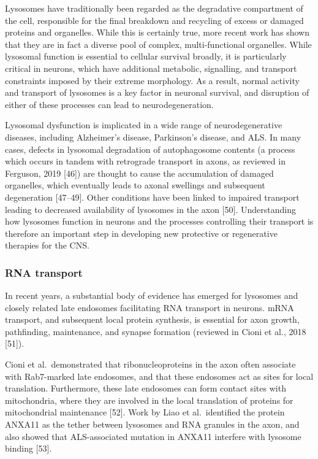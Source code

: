 \documentclass[
  12pt,
  a4paper,
]{book}
\begin{document}
Lysosomes have traditionally been regarded as the degradative compartment of the cell, responsible for the final breakdown and recycling of excess or damaged proteins and organelles. While this is certainly true, more recent work has shown that they are in fact a diverse pool of complex, multi-functional organelles. While lysosomal function is essential to cellular survival broadly, it is particularly critical in neurons, which have additional metabolic, signalling, and transport constraints imposed by their extreme morphology. As a result, normal activity and transport of lysosomes is a key factor in neuronal survival, and disruption of either of these processes can lead to neurodegeneration.

Lysosomal dysfunction is implicated in a wide range of neurodegenerative diseases, including Alzheimer's disease, Parkinson's disease, and ALS. In many cases, defects in lysosomal degradation of autophagosome contents (a process which occurs in tandem with retrograde transport in axons, as reviewed in Ferguson, 2019 {[}46{]}) are thought to cause the accumulation of damaged organelles, which eventually leads to axonal swellings and subsequent degeneration {[}47--49{]}. Other conditions have been linked to impaired transport leading to decreased availability of lysosomes in the axon {[}50{]}. Understanding how lysosomes function in neurons and the processes controlling their transport is therefore an important step in developing new protective or regenerative therapies for the CNS.

\hypertarget{rna-transport}{%
\subsubsection{RNA transport}\label{rna-transport}}

In recent years, a substantial body of evidence has emerged for lysosomes and closely related late endosomes facilitating RNA transport in neurons. mRNA transport, and subsequent local protein synthesis, is essential for axon growth, pathfinding, maintenance, and synapse formation (reviewed in Cioni et al., 2018 {[}51{]}).

Cioni et al.~demonstrated that ribonucleoproteins in the axon often associate with Rab7-marked late endosomes, and that these endosomes act as sites for local translation. Furthermore, these late endosomes can form contact sites with mitochondria, where they are involved in the local translation of proteins for mitochondrial maintenance {[}52{]}. Work by Liao et al.~identified the protein ANXA11 as the tether between lysosomes and RNA granules in the axon, and also showed that ALS-associated mutation in ANXA11 interfere with lysosome binding {[}53{]}.
\end{document}
